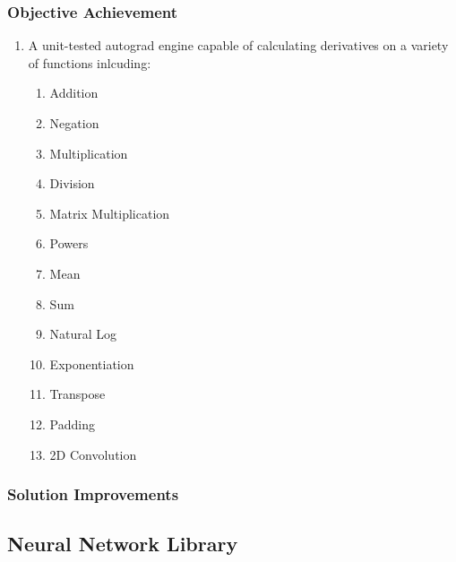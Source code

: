 \documentclass{article}
\begin{document}
    \subsubsection{Objective Achievement}
    \begin{enumerate}
        \item A unit-tested autograd engine capable of calculating derivatives on a variety of functions inlcuding:
        \begin{enumerate}
            \item Addition
            \item Negation
            \item Multiplication
            \item Division
            \item Matrix Multiplication
            \item Powers
            \item Mean
            \item Sum
            \item Natural Log
            \item Exponentiation
            \item Transpose
            \item Padding
            \item 2D Convolution
        \end{enumerate}
    \end{enumerate}
    
    \subsubsection{Solution Improvements}



    \subsection{Neural Network Library}
\end{document}
